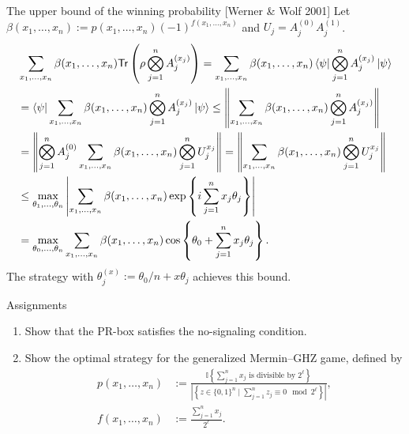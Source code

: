 \documentclass{beamer}
\newcommand{\Tr}{\mathsf{Tr}}
\begin{document}
\begin{frame}{\large The upper bound of the winning probability {\scriptsize [Werner \& Wolf 2001]}}
\scriptsize
Let $\beta(x_1,\dotsc,x_n):=p(x_1,\dotsc,x_n)(-1)^{f(x_1,\dotsc,x_n)}$ and $U_j = A_j^{(0)}A_j^{(1)}$.
\begin{align*}
&\sum_{x_1,\dotsc,x_n}\beta(x_1,\dotsc,x_n)\Tr\left(\rho\bigotimes_{j=1}^n A_j^{(x_j)}\right)
=\sum_{x_1,\dotsc,x_n}\beta(x_1,\dotsc,x_n)\bra{\psi}\bigotimes_{j=1}^n A_j^{(x_j)}\ket{\psi}\\
&=\bra{\psi}\sum_{x_1,\dotsc,x_n}\beta(x_1,\dotsc,x_n)\bigotimes_{j=1}^n A_j^{(x_j)}\ket{\psi}
\le\left\|\sum_{x_1,\dotsc,x_n}\beta(x_1,\dotsc,x_n)\bigotimes_{j=1}^n A_j^{(x_j)}\right\|\\
&=\left\|\bigotimes_{j=1}^nA_j^{(0)}\sum_{x_1,\dotsc,x_n}\beta(x_1,\dotsc,x_n)\bigotimes_{j=1}^n U_j^{x_j}\right\|
=\left\|\sum_{x_1,\dotsc,x_n}\beta(x_1,\dotsc,x_n)\bigotimes_{j=1}^n U_j^{x_j}\right\|\\
&\le\max_{\theta_1,\dotsc,\theta_n}\left|\sum_{x_1,\dotsc,x_n}\beta(x_1,\dotsc,x_n)\exp\left\{i\sum_{j=1}^n x_j\theta_j\right\}\right|\\
&=\max_{\theta_0,\dotsc,\theta_n}\sum_{x_1,\dotsc,x_n}\beta(x_1,\dotsc,x_n)\cos\left\{\theta_0 + \sum_{j=1}^n x_j\theta_j\right\}.
\end{align*}
The strategy with $\theta_j^{(x)}:= \theta_0/n + x\theta_j$ achieves this bound.
\end{frame}

\begin{frame}{Assignments}
\begin{enumerate}
\setlength{\itemsep}{2em}
\item Show that the PR-box satisfies the no-signaling condition.
\item Show the optimal strategy for the generalized Mermin--GHZ game, defined by
\small
\begin{align*}
p(x_1,\dotsc,x_n) &:= \frac{\mathbb{I}\left\{\sum_{j=1}^n x_j\text{ is divisible by } 2^\ell\right\}}{\left|\left\{z\in\{0,1\}^n\mid \sum_{j=1}^n z_j \equiv 0 \mod 2^\ell\right\}\right|},\\
f(x_1,\dotsc,x_n) &:= \frac{\sum_{j=1}^n x_j}{2^\ell}.
\end{align*}
\end{enumerate}
\end{frame}
\end{document}
